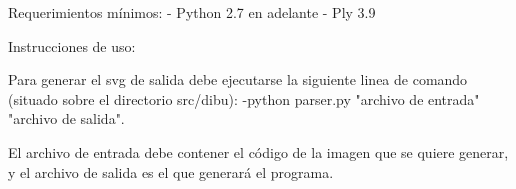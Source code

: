 Requerimientos mínimos:
- Python 2.7 en adelante
- Ply 3.9

Instrucciones de uso:

Para generar el svg de salida debe ejecutarse la siguiente linea de comando (situado sobre el directorio src/dibu):
-python parser.py "archivo de entrada" "archivo de salida".

El archivo de entrada debe contener el código de la imagen que se quiere generar, y el archivo de salida es el que generará
 el programa.
